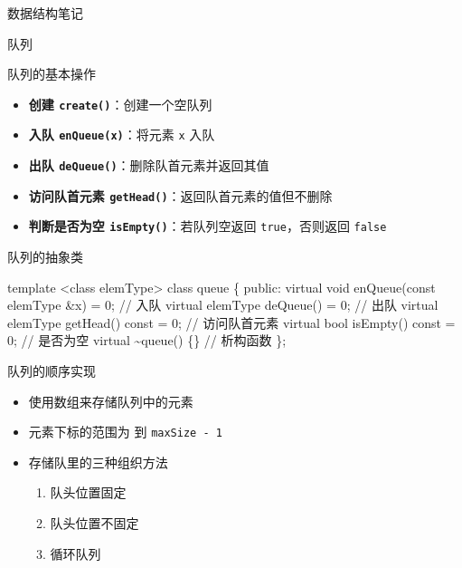 \documentclass[
  ignorenonframetext,
]{beamer}
\newenvironment{Shaded}{}{}
\newcommand{\NormalTok}[1]{#1}
\providecommand{\tightlist}{%
  \setlength{\itemsep}{0pt}\setlength{\parskip}{0pt}}
\begin{document}
\begin{frame}[fragile]{数据结构笔记}
\begin{block}{队列}
\begin{block}{队列的基本操作}
\protect{}\label{ux961fux5217ux7684ux57faux672cux64cdux4f5c}
\begin{itemize}
\tightlist
\item
  \textbf{创建 \texttt{create()}}：创建一个空队列
\item
  \textbf{入队 \texttt{enQueue(x)}}：将元素 \texttt{x} 入队
\item
  \textbf{出队 \texttt{deQueue()}}：删除队首元素并返回其值
\item
  \textbf{访问队首元素 \texttt{getHead()}}：返回队首元素的值但不删除
\item
  \textbf{判断是否为空 \texttt{isEmpty()}}：若队列空返回
  \texttt{true}，否则返回 \texttt{false}
\end{itemize}
\end{block}

\begin{block}{队列的抽象类}
\protect{}\label{ux961fux5217ux7684ux62bdux8c61ux7c7b}
\begin{Shaded}
\begin{Highlighting}[]
\NormalTok{template \textless{}class elemType\textgreater{}}
\NormalTok{class queue}
\NormalTok{\{}
\NormalTok{  public:}
\NormalTok{    virtual void enQueue(const elemType \&x) = 0;       // 入队}
\NormalTok{    virtual elemType deQueue() = 0;                    // 出队}
\NormalTok{    virtual elemType getHead() const = 0;              // 访问队首元素}
\NormalTok{    virtual bool isEmpty() const = 0;                  // 是否为空}
\NormalTok{    virtual \textasciitilde{}queue() \{\}                                 // 析构函数}
\NormalTok{\};}
\end{Highlighting}
\end{Shaded}
\end{block}

\begin{block}{队列的顺序实现}
\protect{}\label{ux961fux5217ux7684ux987aux5e8fux5b9eux73b0}
\begin{itemize}
\tightlist
\item
  使用数组来存储队列中的元素
\item
  元素下标的范围为 {} 到 \texttt{maxSize\ -\ 1}
\item
  存储队里的三种组织方法

  \begin{enumerate}
  \tightlist
  \item
    队头位置固定
  \item
    队头位置不固定
  \item
    循环队列
  \end{enumerate}
\end{itemize}


\end{block}
\end{block}
\end{frame}
\end{document}
